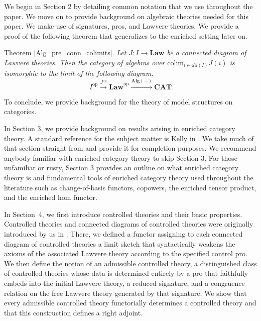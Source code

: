 \documentclass{tac}
\begin{document}
We begin in Section 2 by detailing common notation that we use throughout the paper. We move on to provide background on algebraic theories needed for this paper. We make use of signatures, pros, and Lawvere theories. We provide a proof of the following theorem that generalizes to the enriched setting later on. 


Theorem \ref{Alg_pre_conn_colimits}. \emph{Let $J:I\to\mathbf{Law}$ be a connected diagram of Lawvere theories. Then the category of algebras over $\text{colim}_{i\in\mathbf{ob}(I)}J(i)$ is isomorphic to the limit of the following diagram.
\[
I^\text{op}\xrightarrow{J^\text{op}}\mathbf{Law}^\text{op}\xrightarrow{\mathbf{Alg}(-)}\mathbf{CAT}
\]}


\noindent To conclude, we provide background for the theory of model structures on categories. 

In Section 3, we provide background on results arising in enriched category theory. A standard reference for the subject matter is Kelly in \cite{Kelly3}. We take much of that section straight from \cite{Kelly3} and provide it for completion purposes. We recommend anybody familiar with enriched category theory to skip Section 3.
For those unfamiliar or rusty, Section 3 provides an outline on what enriched category theory is and fundamental tools of enriched category theory used throughout the literature such as change-of-basis functors, copowers, the enriched tensor product, and the enriched hom functor. 

In Section~4, we first introduce controlled theories and their basic properties. Controlled theories and connected diagrams of controlled theories were originally introduced by us in \cite{Taylor2026}. There, we defined a functor assigning to each connected diagram of controlled theories a limit sketch that syntactically weakens the axioms of the associated Lawvere theory according to the specified control pro. We then define the notion of an admissible controlled theory, a distinguished class of controlled theories whose data is determined entirely by a pro that faithfully embeds into the initial Lawvere theory, a reduced signature, and a congruence relation on the free Lawvere theory generated by that signature.  We show that every admissible controlled theory functorially determines a controlled theory and that this construction defines a right adjoint.
\end{document}
